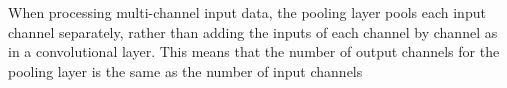 When processing multi-channel input data, the pooling layer pools each input channel separately, rather than adding the inputs of each channel by channel as in a convolutional layer. This means that the number of output channels for the pooling layer is the same as the number of input channels


